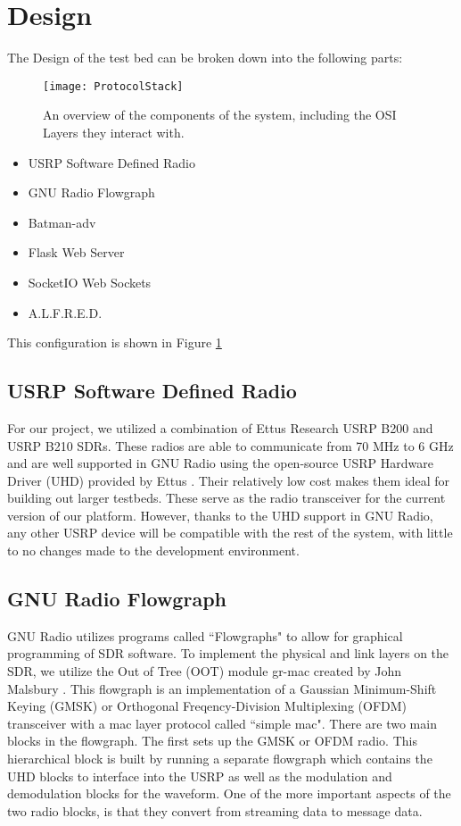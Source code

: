 \section{Design}

The Design of the test bed can be broken down into the following parts:

\begin{figure}
	\centering
	\texttt{[image: ProtocolStack]}
	\caption{An overview of the components of the system, including the OSI Layers they interact with. \cite{0003} \cite{0007} \cite{0008} \cite{0015} \cite{0012} \cite{0011}}
	\label{fig:ProtocolStack}
\end{figure}

\begin{itemize}
	\item USRP Software Defined Radio
	\item GNU Radio Flowgraph
	\item Batman-adv
	\item Flask Web Server
	\item SocketIO Web Sockets
	\item A.L.F.R.E.D. 
\end{itemize}

This configuration is shown in Figure \ref{fig:ProtocolStack}

\subsection{USRP Software Defined Radio}

For our project, we utilized a combination of Ettus Research USRP B200 and USRP B210 SDRs. These radios are able to communicate from 70 MHz to 6 GHz and are well supported in GNU Radio using the open-source USRP Hardware Driver (UHD) provided by Ettus \cite{0007}. Their relatively low cost makes them ideal for building out larger testbeds. These serve as the radio transceiver for the current version of our platform. However, thanks to the UHD support in GNU Radio, any other USRP device will be compatible with the rest of the system, with little to no changes made to the development environment. 

\subsection{GNU Radio Flowgraph}

GNU Radio utilizes programs called ``Flowgraphs" to allow for graphical programming of SDR software. To implement the physical and link layers on the SDR, we utilize the Out of Tree (OOT) module gr-mac created by John Malsbury \cite{0015}. This flowgraph is an implementation of a Gaussian Minimum-Shift Keying (GMSK) or Orthogonal Freqency-Division Multiplexing (OFDM) transceiver with a mac layer protocol called ``simple mac". There are two main blocks in the flowgraph. The first sets up the GMSK or OFDM radio. This hierarchical block is built by running a separate flowgraph which contains the UHD blocks to interface into the USRP as well as the modulation and demodulation blocks for the waveform. One of the more important aspects of the two radio blocks, is that they convert from streaming data to message data. 

